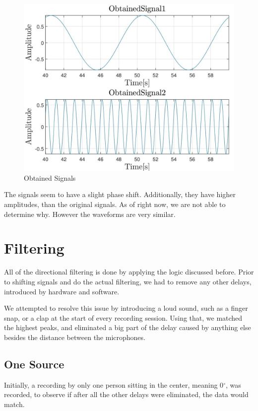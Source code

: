 \begin{figure}[htp]
	\centering
	\includegraphics[width=\textwidth]{Illustrations/obtainedSource1And2.jpg}
	\caption{Obtained Signals}
	\label{fig:obtainedSignals}
\end{figure}

The signals seem to have a slight phase shift. Additionally, they have higher 
amplitudes, than the original signals. As of right now, we are not able to 
determine why. However the waveforms are very similar.
\newpage
\section{Filtering}
All of the directional filtering is done by applying the logic discussed before. 
Prior to shifting signals and do the actual filtering, we had to remove any other 
delays, introduced by hardware and software.

We attempted to resolve this issue by introducing a loud sound, such as a finger 
snap, or a clap at the start of every recording session. Using that, we matched the 
highest peaks, and eliminated a big part of the delay caused by anything else 
besides the distance between the microphones.

\subsection{One Source}
Initially, a recording by only one person sitting in the center, meaning 0$^\circ$, 
was recorded, to observe if after all the other delays were eliminated, the data 
would match.\\


